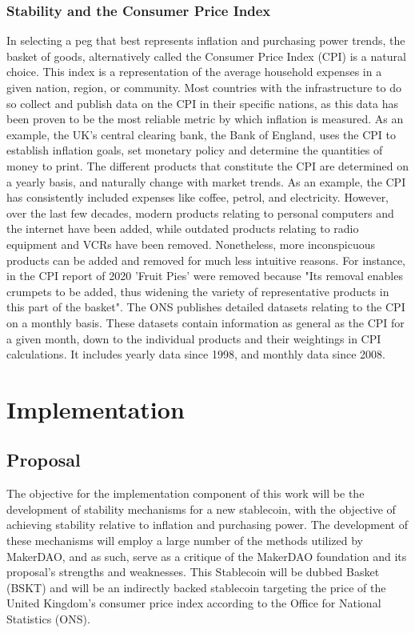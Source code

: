 \documentclass[bsc,frontabs,singlespacing,parskip,deptreport]{infthesis}
\begin{document}
    \subsection{Stability and the Consumer Price Index}
    In selecting a peg that best represents inflation and purchasing power trends, the basket of goods, alternatively called the Consumer Price Index (CPI) is a natural choice. This index is a representation of the average household expenses in a given nation, region, or community. Most countries with the infrastructure to do so collect and publish data on the CPI in their specific nations, as this data has been proven to be the most reliable metric by which inflation is measured. As an example, the UK's central clearing bank, the Bank of England, uses the CPI to establish inflation goals, set monetary policy and determine the quantities of money to print. 
    \smallbreak \noindent
    The different products that constitute the CPI are determined on a yearly basis, and naturally change with market trends. As an example, the CPI has consistently included expenses like coffee, petrol, and electricity. However, over the last few decades, modern products relating to personal computers and the internet have been added, while outdated products relating to radio equipment and VCRs have been removed. Nonetheless, more inconspicuous products can be added and removed for much less intuitive reasons. For instance, in the CPI report of 2020 'Fruit Pies' were removed because "Its removal enables crumpets to be added, thus widening the variety of representative products in this part of the basket". 
    \smallbreak \noindent
    The ONS publishes detailed datasets relating to the CPI on a monthly basis. These datasets contain information as general as the CPI for a given month, down to the individual products and their weightings in CPI calculations. It includes yearly data since 1998, and monthly data since 2008.
\chapter{Implementation}
    \section{Proposal}
    The objective for the implementation component of this work will be the development of stability mechanisms for a new stablecoin, with the objective of achieving stability relative to inflation and purchasing power. The development of these mechanisms will employ a large number of the methods utilized by MakerDAO, and as such, serve as a critique of the MakerDAO foundation and its proposal's strengths and weaknesses. This Stablecoin will be dubbed Basket (BSKT) and will be an indirectly backed stablecoin targeting the price of the United Kingdom's consumer price index according to the Office for National Statistics (ONS). 
\end{document}
